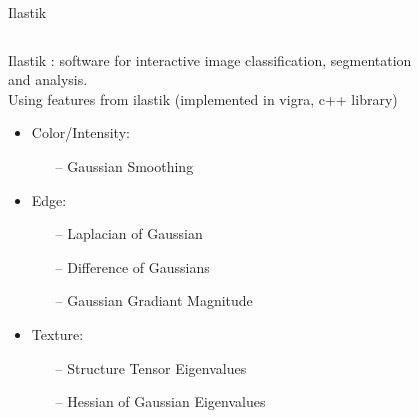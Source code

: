 \documentclass{beamer}
\begin{document}
\begin{frame}{Ilastik}
\begin{columns}[T] %
\begin{column}{.8\textwidth}

Ilastik : software for interactive image classification, segmentation and analysis. \\
Using features from ilastik (implemented in vigra, c++ library)
\begin{itemize}
\item Color/Intensity:
\begin{itemize}
\item [--] Gaussian Smoothing
\end{itemize}
\item Edge:
\begin{itemize}
\item [--] Laplacian of Gaussian
\item [--] Difference of Gaussians
\item [--] Gaussian Gradiant Magnitude
\end{itemize}
\item Texture:
\begin{itemize}
\item [--] Structure Tensor Eigenvalues
\item [--] Hessian of Gaussian Eigenvalues
\end{itemize}
\end{itemize}
\end{column}%
\begin{column}{.2\textwidth}
\begin{figure}[!ht]
\centering

\end{figure}
\end{column}
\end{columns}
\end{frame}
\end{document}
